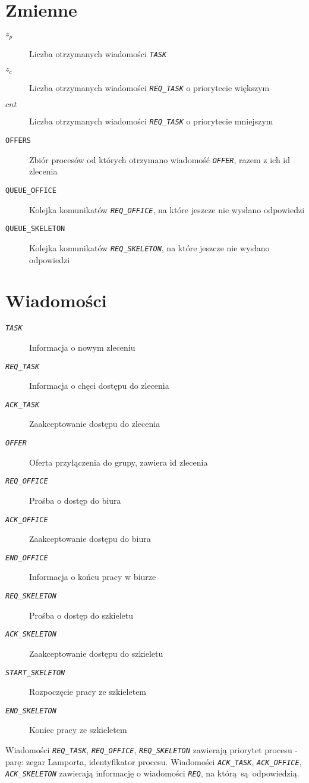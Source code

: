 \documentclass[12pt]{article}
\newcommand{\msg}[1]{\texttt{\emph{#1}}}
\newcommand{\var}[1]{\texttt{#1}}
\begin{document}
\section{Zmienne}
\begin{description}
	\item[$z_p$] Liczba otrzymanych wiadomości \msg{TASK}
	\item[$z_c$] Liczba otrzymanych wiadomości \msg{REQ\_TASK} o priorytecie większym
	\item[$cnt$] Liczba otrzymanych wiadomości \msg{REQ\_TASK} o priorytecie mniejszym
	
	\item[\var{OFFERS}] Zbiór procesów od których otrzymano wiadomość \msg{OFFER}, razem z ich id zlecenia
	
	\item[\var{QUEUE\_OFFICE}] Kolejka komunikatów \msg{REQ\_OFFICE}, na które jeszcze nie wysłano odpowiedzi
	\item[\var{QUEUE\_SKELETON}] Kolejka komunikatów \msg{REQ\_SKELETON}, na które jeszcze nie wysłano odpowiedzi
\end{description}

\section{Wiadomości}
\begin{description}
	\item[\msg{TASK}] Informacja o nowym zleceniu
	\item[\msg{REQ\_TASK}] Informacja o chęci dostępu do zlecenia
	\item[\msg{ACK\_TASK}] Zaakceptowanie dostępu do zlecenia
	\item[\msg{OFFER}] Oferta przyłączenia do grupy, zawiera id zlecenia
	\item[\msg{REQ\_OFFICE}] Prośba o dostęp do biura
	\item[\msg{ACK\_OFFICE}] Zaakceptowanie dostępu do biura
	\item[\msg{END\_OFFICE}] Informacja o końcu pracy w biurze
	\item[\msg{REQ\_SKELETON}] Prośba o dostęp do szkieletu
	\item[\msg{ACK\_SKELETON}] Zaakceptowanie dostępu do szkieletu
	\item[\msg{START\_SKELETON}] Rozpoczęcie pracy ze szkieletem
	\item[\msg{END\_SKELETON}] Koniec pracy ze szkieletem
\end{description}
Wiadomości \msg{REQ\_TASK}, \msg{REQ\_OFFICE}, \msg{REQ\_SKELETON} zawierają priorytet procesu - parę: zegar Lamporta, identyfikator procesu. Wiadomości \msg{ACK\_TASK}, \msg{ACK\_OFFICE}, \msg{ACK\_SKELETON} zawierają informację o wiadomości \msg{REQ}, na którą są odpowiedzią.
\end{document}

